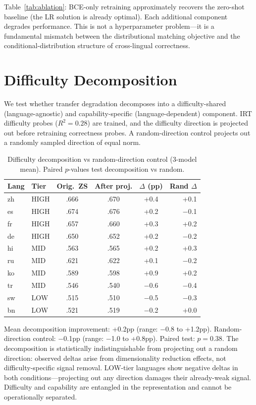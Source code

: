 \documentclass[11pt,a4paper]{article}
\begin{document}
Table~\ref{tab:ablation}: BCE-only retraining approximately recovers the zero-shot baseline (the LR solution is already optimal).
Each additional component degrades performance.
This is not a hyperparameter problem---it is a fundamental mismatch between the distributional matching objective and the conditional-distribution structure of cross-lingual correctness.

\section{Difficulty Decomposition}
\label{sec:decomp}

We test whether transfer degradation decomposes into a difficulty-shared (language-agnostic) and capability-specific (language-dependent) component.
IRT difficulty probes ($R^2{=}0.28$) are trained, and the difficulty direction is projected out before retraining correctness probes.
A random-direction control projects out a randomly sampled direction of equal norm.

\begin{table}[t]
\centering
\small
\caption{Difficulty decomposition vs random-direction control (3-model mean). Paired $p$-values test decomposition vs random.}
\label{tab:decomp}
\begin{tabular}{llcccr}
\toprule
Lang & Tier & Orig.\ ZS & After proj. & $\Delta$ (pp) & Rand $\Delta$ \\
\midrule
zh & HIGH & .666 & .670 & +0.4 & +0.1 \\
es & HIGH & .674 & .676 & +0.2 & $-$0.1 \\
fr & HIGH & .657 & .660 & +0.3 & +0.2 \\
de & HIGH & .650 & .652 & +0.2 & $-$0.2 \\
hi & MID & .563 & .565 & +0.2 & +0.3 \\
ru & MID & .621 & .622 & +0.1 & $-$0.2 \\
ko & MID & .589 & .598 & +0.9 & +0.2 \\
tr & MID & .546 & .540 & $-$0.6 & $-$0.4 \\
sw & LOW & .515 & .510 & $-$0.5 & $-$0.3 \\
bn & LOW & .521 & .519 & $-$0.2 & $+$0.0 \\
\bottomrule
\end{tabular}
\end{table}

Mean decomposition improvement: +0.2pp (range: $-$0.8 to +1.2pp).
Random-direction control: $-$0.1pp (range: $-$1.0 to +0.8pp).
Paired test: $p{=}0.38$.
The decomposition is statistically indistinguishable from projecting out a random direction: observed deltas arise from dimensionality reduction effects, not difficulty-specific signal removal.
LOW-tier languages show negative deltas in both conditions---projecting out any direction damages their already-weak signal.
Difficulty and capability are entangled in the representation and cannot be operationally separated.
\end{document}

